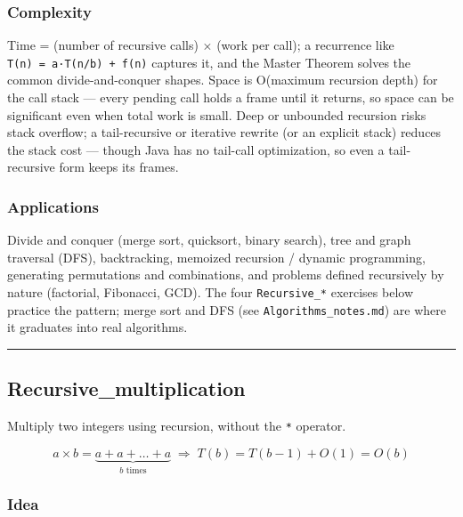 \documentclass[
  10pt,
  letterpaper,
  onecolumn]{article}
\begin{document}
\hypertarget{complexity}{%
\subsubsection{Complexity}\label{complexity}}

Time = (number of recursive calls) × (work per call); a recurrence like
\texttt{T(n)\ =\ a·T(n/b)\ +\ f(n)} captures it, and the Master Theorem
solves the common divide-and-conquer shapes. Space is O(maximum
recursion depth) for the call stack --- every pending call holds a frame
until it returns, so space can be significant even when total work is
small. Deep or unbounded recursion risks stack overflow; a
tail-recursive or iterative rewrite (or an explicit stack) reduces the
stack cost --- though Java has no tail-call optimization, so even a
tail-recursive form keeps its frames.

\hypertarget{applications}{%
\subsubsection{Applications}\label{applications}}

Divide and conquer (merge sort, quicksort, binary search), tree and
graph traversal (DFS), backtracking, memoized recursion / dynamic
programming, generating permutations and combinations, and problems
defined recursively by nature (factorial, Fibonacci, GCD). The four
\texttt{Recursive\_*} exercises below practice the pattern; merge sort
and DFS (see \texttt{Algorithms\_notes.md}) are where it graduates into
real algorithms.

\begin{center}\rule{0.5\linewidth}{0.5pt}\end{center}

\hypertarget{recursive_multiplication}{%
\subsection{Recursive\_multiplication}\label{recursive_multiplication}}

Multiply two integers using recursion, without the \texttt{*} operator.

\begin{equation*}
a\times b=\underbrace{a+a+\dots+a}_{b\text{ times}}
\;\Longrightarrow\;
T(b)=T(b-1)+O(1)=O(b)
\end{equation*}

\hypertarget{idea-1}{%
\subsubsection{Idea}\label{idea-1}}
\end{document}
